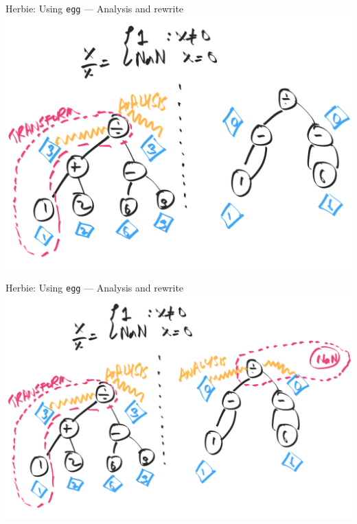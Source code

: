 \documentclass[8pt]{beamer}
\newcommand{\egg}{\texttt{egg} }
\begin{document}
\begin{frame}[fragile]{Herbie: Using \egg --- Analysis and rewrite}
\includegraphics[width=\textwidth]{./rewrite-6.png}
\end{frame}


\begin{frame}[fragile]{Herbie: Using \egg --- Analysis and rewrite}
\includegraphics[width=\textwidth]{./rewrite-7.png}
\end{frame}
\end{document}
